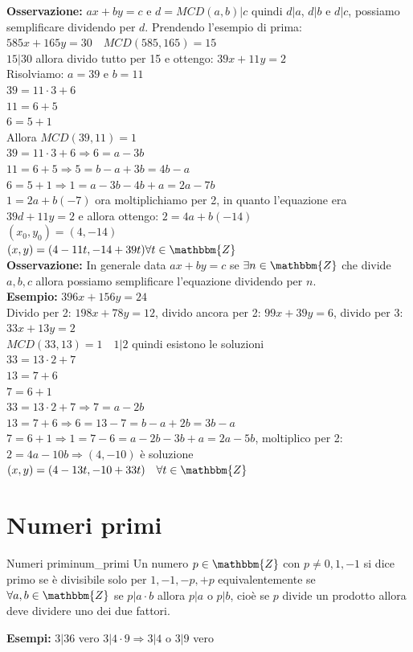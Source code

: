 \documentclass[12pt, letterpaper]{report}
\newcounter{definition}
\newcommand{\nmu}{}
\begin{document}
			\textbf{Osservazione:} $ax + by = c$ e $d = MCD(a,b) | c$ quindi $d | a$, $d | b$ e $d | c$, possiamo semplificare dividendo per $d$. Prendendo l'esempio di prima: \\
			$585x + 165y = 30 \quad MCD(585, 165) = 15$ \\
			$15|30$ allora divido tutto per 15 e ottengo: $39x + 11y = 2$ \\
			Risolviamo: $a = 39$ e $b = 11$ \\
			$39 = 11 \cdot 3 + 6$ \\
			$11 = 6 + 5$ \\
			$6 = 5 + 1$ \\
			Allora $MCD(39, 11) = 1$ \\
			$39 = 11 \cdot 3 + 6 \Rightarrow 6 = a - 3b$ \\
			$11 = 6 + 5 \Rightarrow 5 = b - a + 3b = 4b - a$ \\
			$6 = 5 + 1 \Rightarrow 1 = a - 3b - 4b + a = 2a - 7b$ \\
			$1 = 2a +b(-7)$ ora moltiplichiamo per 2, in quanto l'equazione era $39d + 11y = 2$ e allora ottengo: $2 = 4a + b(-14)$ \\
			$(x_0, y_0) = (4, -14)$ \\
			$(x,y) = (4 - 11t, -14 + 39t) \forall t \in \mathbbm{Z}$ \\
			\textbf{Osservazione:} In generale data $ax + by = c$ se $\exists n \in \mathbbm{Z}$ che divide $a,b,c$ allora possiamo semplificare l'equazione dividendo per $n$. \\
			\textbf{Esempio:} $396x + 156y = 24$ \\
			Divido per 2: $198x + 78y = 12$, divido ancora per 2: $99x + 39y = 6$, divido per 3: $33x + 13y = 2$
			\\ $MCD(33, 13) = 1 \quad 1|2$ quindi esistono le soluzioni \\
			$33 = 13 \cdot 2 + 7$ \\
			$13 = 7 + 6$ \\
			$7 = 6 + 1$ \\
			$33 = 13 \cdot 2 + 7 \Rightarrow 7 = a - 2b$ \\
			$13 = 7 + 6 \Rightarrow 6 = 13 - 7 = b - a + 2b = 3b - a$ \\
			$7 = 6 + 1 \Rightarrow 1 = 7 - 6 = a - 2b - 3b + a = 2a - 5b$, moltiplico per 2: $2 = 4a - 10b \Rightarrow (4, -10)$ è soluzione \\
			$(x,y) = (4 - 13t, -10 + 33t) \quad \forall t \in \mathbbm{Z}$
		\section{Numeri primi}
		\begin{definition}{\nmu Numeri primi}{num_primi}
			Un numero $p \in \mathbbm{Z}$ con $p \neq 0,1,-1$ si dice primo se è divisibile solo per $1, -1, -p, +p$ equivalentemente se $\forall a,b \in \mathbbm{Z}$ se $p|a \cdot b$ allora $p|a$ o $p|b$, cioè se $p$ divide un prodotto allora deve dividere uno dei due fattori.
		\end{definition}
		\textbf{Esempi:} $3|36$ vero $3|4 \cdot 9 \Rightarrow 3|4$ o $3|9$ vero \\
\end{document}

